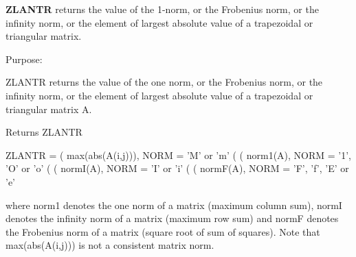 {\bfseries Z\+L\+A\+N\+T\+R} returns the value of the 1-\/norm, or the Frobenius norm, or the infinity norm, or the element of largest absolute value of a trapezoidal or triangular matrix. 

 \begin{DoxyParagraph}{Purpose\+: }
\begin{DoxyVerb} ZLANTR  returns the value of the one norm,  or the Frobenius norm, or
 the  infinity norm,  or the  element of  largest absolute value  of a
 trapezoidal or triangular matrix A.\end{DoxyVerb}

\end{DoxyParagraph}
\begin{DoxyReturn}{Returns}
Z\+L\+A\+N\+T\+R \begin{DoxyVerb}    ZLANTR = ( max(abs(A(i,j))), NORM = 'M' or 'm'
             (
             ( norm1(A),         NORM = '1', 'O' or 'o'
             (
             ( normI(A),         NORM = 'I' or 'i'
             (
             ( normF(A),         NORM = 'F', 'f', 'E' or 'e'

 where  norm1  denotes the  one norm of a matrix (maximum column sum),
 normI  denotes the  infinity norm  of a matrix  (maximum row sum) and
 normF  denotes the  Frobenius norm of a matrix (square root of sum of
 squares).  Note that  max(abs(A(i,j)))  is not a consistent matrix norm.\end{DoxyVerb}
 
\end{DoxyReturn}

